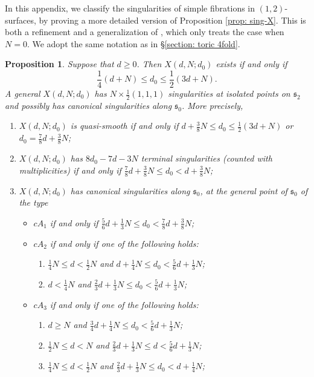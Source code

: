 \documentclass[a4paper,11pt]{amsart}
\newcommand{\s}{\ensuremath{\mathfrak{s}}}
\newtheorem{prop}[thm]{Proposition}
\theoremstyle{definition}
\theoremstyle{remark}
\numberwithin{equation}{section}
\begin{document}
In this appendix, we classify the singularities of simple fibrations in $(1,2)$-surfaces, by proving a more detailed version of Proposition \ref{prop: sing-X}. This is both a refinement and a generalization of \cite[Proposition 1.6]{CP}, which only treats the case when $N = 0$. We adopt the same notation as in \S \ref{section: toric 4fold}.
\begin{prop} \label{prop: sing-X-appendix} %
	Suppose that $d \ge 0$. Then $X(d, N; d_0)$ exists if and only if
	$$
	\frac14 (d + N) \le d_0 \le \frac12 (3d+N).
	$$
	A general $X(d, N; d_0)$ has $N \times \frac12 (1, 1, 1)$ singularities at isolated points on $\s_2$ and possibly has canonical singularities along $\s_0$. More precisely, 
	\begin{enumerate}
		\item $X(d, N; d_0)$ is quasi-smooth if and only if $d + \frac38 N \le d_0 \le 
		\frac12 (3d+N)$ or $d_0 = \frac78d + \frac38 N$;
		\item $X(d, N; d_0)$ has $8d_0-7d-3N$ terminal singularities (counted with multiplicities) if and only if $\frac78 d + \frac38N \le d_0 < d + \frac38 N$;
		\item $X(d, N; d_0)$ has canonical singularities along $\s_0$, at the general point of $\s_0$ of the type 
		\begin{itemize}
			\item $cA_1$ if and only if $\frac56d + \frac13 N \le d_0 < \frac78d + \frac38 N$;
            
            \item $cA_2$ if and only if one of the following holds:
            \begin{enumerate}
                \item $\frac{1}{4}N\leq d<\frac{1}{2}N$ and $d+\frac{1}{4}N\leq d_0<\frac{5}{6}d+\frac{1}{3}N$;
                \item $d<\frac{1}{4}N$ and $\frac{2}{3}d+\frac{1}{3}N\leq d_0<\frac{5}{6}d+\frac{1}{3}N$;
            \end{enumerate}
            
			\item $cA_3$ if and only if one of the following holds:
            \begin{enumerate}
                \item $d \geq N$ and $\frac34d + \frac14 N \le d_0 < \frac56d + \frac13 N$;
                \item $\frac{1}{2}N\leq d<N$ and $\frac{2}{3}d+\frac{1}{3}N\leq d<\frac{5}{6}d+\frac{1}{3}N$;
                \item $\frac{1}{4}N\leq d<\frac{1}{2}N$ and $\frac{2}{3}d+\frac{1}{3}N\leq d_0<d+\frac{1}{4}N$;
            \end{enumerate}
            

\end{itemize}
\end{enumerate}
\end{prop}
\end{document}

